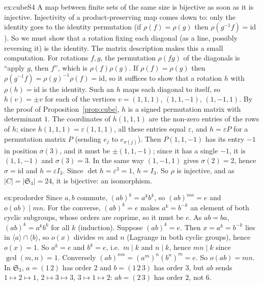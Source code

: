 \begin{solution}{ex:cubeS4}
\idea A map between finite sets of the same size is bijective as soon as it is injective. Injectivity of a product-preserving map comes down to: only the identity goes to the identity permutation (if $\rho(f)=\rho(g)$ then $\rho(g^{-1}f)=\mathrm{id}$). So we must show that a rotation fixing each diagonal (as a line, possibly reversing it) is the identity. The matrix description makes this a small computation.
\writeup For rotations $f,g$, the permutation $\rho(fg)$ of the diagonals is ``apply $g$, then $f$'', which is $\rho(f)\rho(g)$. If $\rho(f)=\rho(g)$ then $\rho(g^{-1}f)=\rho(g)^{-1}\rho(f)=\mathrm{id}$, so it suffices to show that a rotation $h$ with $\rho(h)=\mathrm{id}$ is the identity.
Such an $h$ maps each diagonal to itself, so $h(v)=\pm v$ for each of the vertices $v=(1,1,1)$, $(1,1,-1)$, $(1,-1,1)$. By the proof of Proposition~\ref{prop:cube}, $h$ is a signed permutation matrix with determinant $1$. The coordinates of $h(1,1,1)$ are the non-zero entries of the rows of $h$; since $h(1,1,1)=\varepsilon(1,1,1)$, all these entries equal $\varepsilon$, and $h=\varepsilon P$ for a permutation matrix $P$ (sending $e_j$ to $e_{\sigma(j)}$). Then $P(1,1,-1)$ has its entry $-1$ in position $\sigma(3)$, and it must be $\pm(1,1,-1)$; since it has a single $-1$, it is $(1,1,-1)$ and $\sigma(3)=3$. In the same way $(1,-1,1)$ gives $\sigma(2)=2$, hence $\sigma=\mathrm{id}$ and $h=\varepsilon I_3$. Since $\det h=\varepsilon^3=1$, $h=I_3$.
So $\rho$ is injective, and as $|C|=|\mathfrak S_4|=24$, it is bijective: an isomorphism.
\end{solution}

\begin{solution}{ex:prodorder}
\idea Since $a,b$ commute, $(ab)^k=a^kb^k$, so $(ab)^{mn}=e$ and $o(ab)\mid mn$. For the converse, $(ab)^k=e$ makes $a^k=b^{-k}$ an element of both cyclic subgroups, whose orders are coprime, so it must be $e$.
\writeup As $ab=ba$, $(ab)^k=a^kb^k$ for all $k$ (induction). Suppose $(ab)^k=e$. Then $x=a^k=b^{-k}$ lies in $\langle a\rangle\cap\langle b\rangle$, so $o(x)$ divides $m$ and $n$ (Lagrange in both cyclic groups), hence $o(x)=1$. So $a^k=e$ and $b^k=e$, i.e.\ $m\mid k$ and $n\mid k$, hence $mn\mid k$ since $\gcd(m,n)=1$. Conversely $(ab)^{mn}=(a^m)^n(b^n)^m=e$. So $o(ab)=mn$.
In $\mathfrak S_3$, $a=(1\,2)$ has order $2$ and $b=(1\,2\,3)$ has order $3$, but $ab$ sends $1\mapsto 2\mapsto 1$, $2\mapsto3\mapsto3$, $3\mapsto1\mapsto2$: $ab=(2\,3)$ has order $2$, not $6$.
\end{solution}


